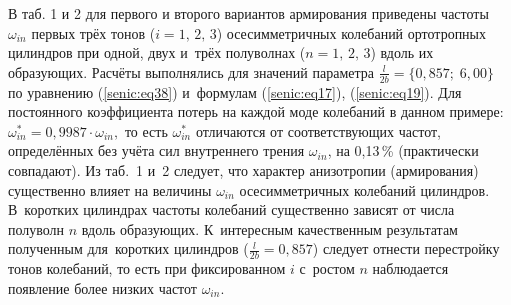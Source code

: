 В таб. 1 и 2 для первого и второго вариантов армирования приведены  частоты 
$\omega _{in} $ первых трёх тонов ($i = 1,\,2,\,3$) осесимметричных колебаний 
ортотропных цилиндров при одной, двух и~трёх полуволнах ($n = 1,\,2,\,3$) вдоль их 
образующих. Расчёты выполнялись для значений параметра 
$\frac{l}{2b}=\{0{,}857;\; 6{,}00\}$ по уравнению (\ref{senic:eq38}) 
и~формулам (\ref{senic:eq17}), (\ref{senic:eq19}). 
Для постоянного коэффициента потерь на каждой моде колебаний в данном 
примере: $\omega _{in}^\ast =  0{,}9987 \cdot \omega _{in},$ то есть $\omega 
_{in}^\ast $ отличаются от соответствующих частот, определённых без учёта 
сил внутреннего трения $\omega _{in} $, на 0,13\,{\%} (практически совпадают). 
Из таб.~1 и~2 следует, что характер анизотропии (армирования) существенно 
влияет на величины $\omega _{in} $ осесимметричных колебаний цилиндров. 
В~коротких цилиндрах частоты колебаний существенно зависят от числа полуволн 
$n$ вдоль образующих. К~интересным качественным результатам полученным для~коротких цилиндров 
($\frac{l}{2b}=0{,}857$) следует отнести перестройку тонов 
колебаний, то есть при фиксированном $i$ с~ростом $n$ наблюдается появление более низких частот 
$\omega _{in} $.




